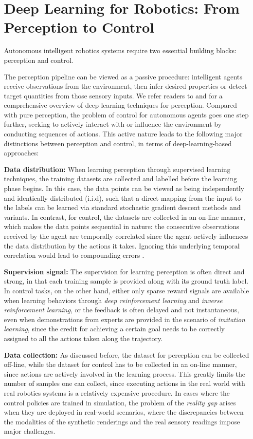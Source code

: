 \section{Deep Learning for Robotics: From Perception to Control}
Autonomous intelligent robotics systems require two essential building blocks: perception and control.

The perception pipeline can be viewed as a passive procedure:
intelligent agents receive observations from the environment,
then infer desired properties or detect target quantities from those sensory inputs.
We refer readers to \cite{deng2014tutorial} and \cite{guo2016deep} for a comprehensive overview of deep learning techniques for perception.
Compared with pure perception, the problem of control for autonomous agents goes one step further,
seeking to actively interact with or influence the environment by conducting sequences of actions.
This active nature leads to the following major distinctions between perception and control, in terms of deep-learning-based approaches:

\textbf{Data distribution:} When learning perception through supervised learning techniques,
the training datasets are collected and labelled before the learning phase begins.
In this case, the data points can be viewed as being independently and identically distributed (i.i.d),
such that a direct mapping from the input to the labels can be learned via standard stochastic gradient descent methods and variants.
In contrast, for control, the datasets are collected in an on-line manner, which makes the data points sequential in nature: the consecutive observations received by the agent are temporally correlated since the agent actively influences the data distribution by the actions it takes. Ignoring this underlying temporal correlation would lead to compounding errors \cite{bagnell2015invitation}.

\textbf{Supervision signal:} The supervision for learning perception is often direct and strong,
in that each training sample is provided along with its ground truth label.
In control tasks, on the other hand, either only sparse reward signals are available when learning behaviors through \textit{deep reinforcement learning} and \textit{inverse reinforcement learning},
or the feedback is often delayed and not instantaneous,
even when demonstrations from experts are provided in the scenario of \textit{imitation learning},
since the credit for achieving a certain goal needs to be correctly assigned to all the actions taken along the trajectory.

\textbf{Data collection:} As discussed before, the dataset for perception can be collected off-line, while the dataset for control has to be collected in an on-line manner, since actions are actively involved in the learning process. This greatly limits the number of samples one can collect, since executing actions in the real world with real robotics systems is a relatively expensive procedure. In cases where the control policies are trained in simulation, the problem of the \textit{reality gap} arises when they are deployed in real-world scenarios, where the discrepancies between the modalities of the synthetic renderings and the real sensory readings impose major challenges.
